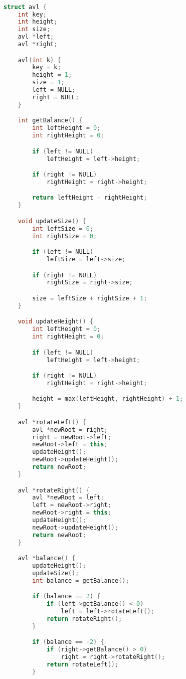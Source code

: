 \documentclass[leter]{amsart}
\begin{document}
\begin{multicols}{2}
\begin{lstlisting}[language=C++]

struct avl {
    int key;
    int height;
    int size;
    avl *left;
    avl *right;

    avl(int k) {
        key = k;
        height = 1;
        size = 1;
        left = NULL;
        right = NULL;
    }

    int getBalance() {
        int leftHeight = 0;
        int rightHeight = 0;

        if (left != NULL)
            leftHeight = left->height;

        if (right != NULL)
            rightHeight = right->height;

        return leftHeight - rightHeight;
    }

    void updateSize() {
        int leftSize = 0;
        int rightSize = 0;

        if (left != NULL)
            leftSize = left->size;

        if (right != NULL)
            rightSize = right->size;

        size = leftSize + rightSize + 1;
    }

    void updateHeight() {
        int leftHeight = 0;
        int rightHeight = 0;

        if (left != NULL)
            leftHeight = left->height;

        if (right != NULL)
            rightHeight = right->height;

        height = max(leftHeight, rightHeight) + 1;
    }

    avl *rotateLeft() {
        avl *newRoot = right;
        right = newRoot->left;
        newRoot->left = this;
        updateHeight();
        newRoot->updateHeight();
        return newRoot;
    }

    avl *rotateRight() {
        avl *newRoot = left;
        left = newRoot->right;
        newRoot->right = this;
        updateHeight();
        newRoot->updateHeight();
        return newRoot;
    }

    avl *balance() {
        updateHeight();
        updateSize();
        int balance = getBalance();

        if (balance == 2) {
            if (left->getBalance() < 0)
                left = left->rotateLeft();
            return rotateRight();
        }

        if (balance == -2) {
            if (right->getBalance() > 0)
                right = right->rotateRight();
            return rotateLeft();
        }


\end{lstlisting}
\end{multicols}
\end{document}
